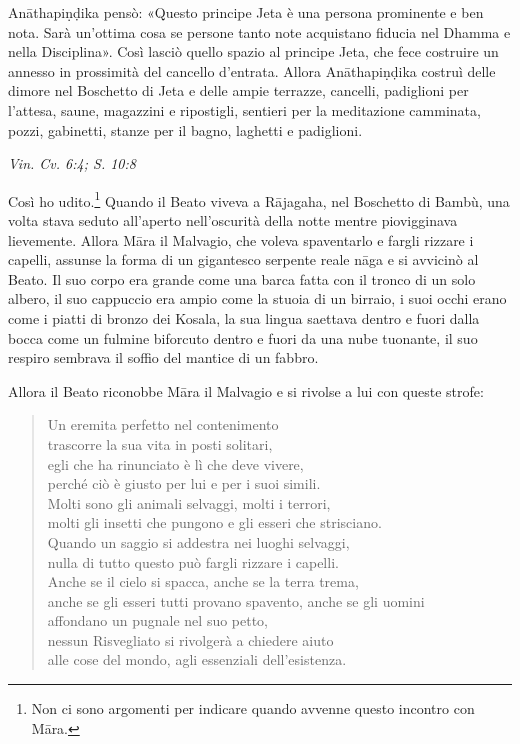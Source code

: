 Anāthapiṇḍika pensò: «Questo principe Jeta è una persona prominente e
ben nota. Sarà un’ottima cosa se persone tanto note acquistano fiducia
nel Dhamma e nella Disciplina». Così lasciò quello spazio al principe
Jeta, che fece costruire un annesso in prossimità del cancello
d’entrata. Allora Anāthapiṇḍika costruì delle dimore nel Boschetto di
Jeta e delle ampie terrazze, cancelli, padiglioni per l’attesa, saune,
magazzini e ripostigli, sentieri per la meditazione camminata, pozzi,
gabinetti, stanze per il bagno, laghetti e padiglioni.


\emph{Vin. Cv. 6:4; S. 10:8}


 Così ho udito.\footnote{Non ci sono argomenti per indicare quando avvenne questo incontro con Māra.} Quando il Beato viveva a
Rājagaha, nel Boschetto di Bambù, una volta stava seduto all’aperto
nell’oscurità della notte mentre piovigginava lievemente. Allora Māra il
Malvagio, che voleva spaventarlo e fargli rizzare i capelli, assunse la
forma di un gigantesco serpente reale nāga e si avvicinò al Beato. Il
suo corpo era grande come una barca fatta con il tronco di un solo
albero, il suo cappuccio era ampio come la stuoia di un birraio, i suoi
occhi erano come i piatti di bronzo dei Kosala, la sua lingua saettava
dentro e fuori dalla bocca come un fulmine biforcuto dentro e fuori da
una nube tuonante, il suo respiro sembrava il soffio del mantice di un
fabbro.


Allora il Beato riconobbe Māra il Malvagio e si rivolse a lui con queste
strofe:


\begin{quote}
Un eremita perfetto nel contenimento \\
trascorre la sua vita in posti solitari, \\
egli che ha rinunciato è lì che deve vivere, \\
perché ciò è giusto per lui e per i suoi simili. \\
Molti sono gli animali selvaggi, molti i terrori, \\
molti gli insetti che pungono e gli esseri che strisciano. \\
Quando un saggio si addestra nei luoghi selvaggi, \\
nulla di tutto questo può fargli rizzare i capelli. \\
Anche se il cielo si spacca, anche se la terra trema, \\
anche se gli esseri tutti provano spavento, anche se gli uomini \\
affondano un pugnale nel suo petto, \\
nessun Risvegliato si rivolgerà a chiedere aiuto \\
alle cose del mondo, agli essenziali dell’esistenza.
\end{quote}

